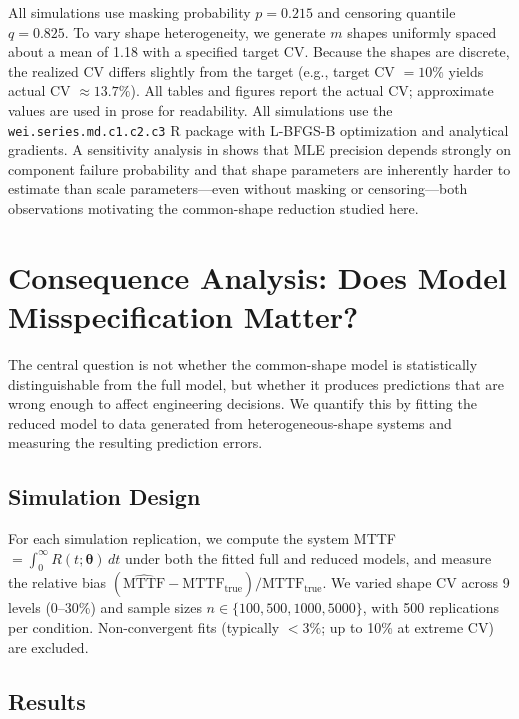 \documentclass[11pt]{article}
\renewcommand{\v}[1]{\boldsymbol{#1}}
\begin{document}
All simulations use masking probability $p = 0.215$ and censoring quantile $q = 0.825$. To vary shape heterogeneity, we generate $m$ shapes uniformly spaced about a mean of 1.18 with a specified target CV. Because the shapes are discrete, the realized CV differs slightly from the target (e.g., target CV $= 10\%$ yields actual CV $\approx 13.7\%$). All tables and figures report the actual CV; approximate values are used in prose for readability. All simulations use the \texttt{wei.series.md.c1.c2.c3} R package \citep{towell2023weibull} with L-BFGS-B optimization \citep{byrd1995} and analytical gradients. A sensitivity analysis in \citep{towell2023reliability} shows that MLE precision depends strongly on component failure probability and that shape parameters are inherently harder to estimate than scale parameters---even without masking or censoring---both observations motivating the common-shape reduction studied here.

\section{Consequence Analysis: Does Model Misspecification Matter?}
\label{sec:consequences}

The central question is not whether the common-shape model is statistically distinguishable from the full model, but whether it produces predictions that are wrong enough to affect engineering decisions. We quantify this by fitting the reduced model to data generated from heterogeneous-shape systems and measuring the resulting prediction errors.

\subsection{Simulation Design}

For each simulation replication, we compute the system MTTF $= \int_0^\infty R(t; \v\theta)\, dt$ under both the fitted full and reduced models, and measure the relative bias $(\widehat{\text{MTTF}} - \text{MTTF}_{\text{true}}) / \text{MTTF}_{\text{true}}$. We varied shape CV across 9 levels (0--30\%) and sample sizes $n \in \{100, 500, 1000, 5000\}$, with 500 replications per condition. Non-convergent fits (typically $< 3\%$; up to 10\% at extreme CV) are excluded.

\subsection{Results}
\end{document}
